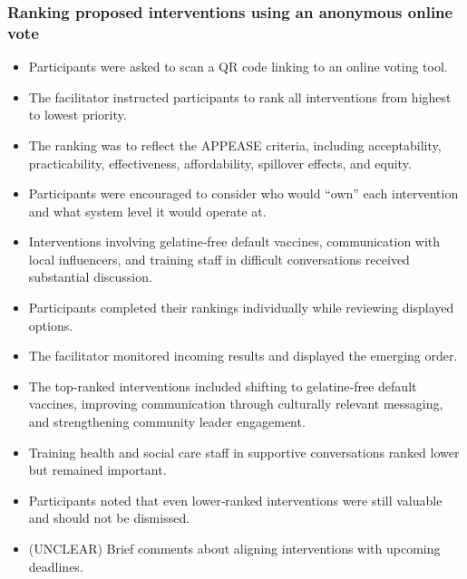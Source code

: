 \documentclass{article}
\begin{document}
\subsubsection{Ranking proposed interventions using an anonymous online vote}

\begin{itemize}
    \item Participants were asked to scan a QR code linking to an online voting tool.
    \item The facilitator instructed participants to rank all interventions from highest to lowest priority.
    \item The ranking was to reflect the APPEASE criteria, including acceptability, practicability, effectiveness, affordability, spillover effects, and equity.
    \item Participants were encouraged to consider who would “own” each intervention and what system level it would operate at.
    \item Interventions involving gelatine‑free default vaccines, communication with local influencers, and training staff in difficult conversations received substantial discussion.
    \item Participants completed their rankings individually while reviewing displayed options.
    \item The facilitator monitored incoming results and displayed the emerging order.
    \item The top‑ranked interventions included shifting to gelatine‑free default vaccines, improving communication through culturally relevant messaging, and strengthening community leader engagement.
    \item Training health and social care staff in supportive conversations ranked lower but remained important.
    \item Participants noted that even lower‑ranked interventions were still valuable and should not be dismissed.
    \item (UNCLEAR) Brief comments about aligning interventions with upcoming deadlines.
\end{itemize}
\end{document}
